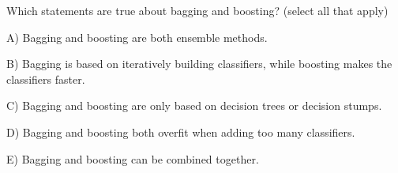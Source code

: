 Which statements are true about bagging and boosting? (select all that apply)


A) Bagging and boosting are both ensemble methods.


B) Bagging is based on iteratively building classifiers, while boosting makes the classifiers faster.


C) Bagging and boosting are only based on decision trees or decision stumps.


D) Bagging and boosting both overfit when adding too many classifiers.


E) Bagging and boosting can be combined together.
